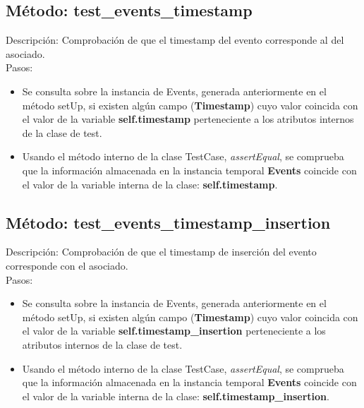 

\subsection{\quad Método: test\_events\_timestamp}

Descripción: Comprobación de que el timestamp del evento corresponde al del asociado.\\
Pasos:
\begin{itemize}
\item Se consulta sobre la instancia de Events, generada anteriormente en el método setUp, si existen algún campo (\textbf{Timestamp}) cuyo valor coincida con el valor de la variable \textbf{self.timestamp} perteneciente a los atributos internos de la clase de test.
\item Usando el método interno de la clase TestCase, \emph{assertEqual}, se comprueba que la información almacenada en la instancia temporal \textbf{Events} coincide con el valor de la variable interna de la clase: \textbf{self.timestamp}.
\end{itemize}



\subsection{\quad Método: test\_events\_timestamp\_insertion}

Descripción: Comprobación de que el timestamp de inserción del evento corresponde con el asociado.\\
Pasos:
\begin{itemize}
\item Se consulta sobre la instancia de Events, generada anteriormente en el método setUp, si existen algún campo (\textbf{Timestamp}) cuyo valor coincida con el valor de la variable \textbf{self.timestamp\_insertion} perteneciente a los atributos internos de la clase de test.
\item Usando el método interno de la clase TestCase, \emph{assertEqual}, se comprueba que la información almacenada en la instancia temporal \textbf{Events} coincide con el valor de la variable interna de la clase: \textbf{self.timestamp\_insertion}.
\end{itemize}



